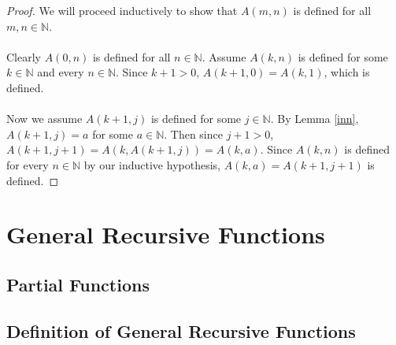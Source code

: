 \documentclass[12pt, letterpaper]{article}
\begin{document}
    \begin{proof}
      We will proceed inductively to show that $A(m, n)$ is defined for all $m, n \in \mathbb{N}$.
      \\ 
      \\
      Clearly $A(0, n)$ is defined for all $n \in \mathbb{N}$.
      Assume $A(k, n)$ is defined for some $k \in \mathbb{N}$ and every $n \in \mathbb{N}$.
      Since $k + 1 > 0$, $A(k + 1, 0) = A(k, 1)$, which is defined.
      \\
      \\
      Now we assume $A(k + 1, j)$ is defined for some $j \in \mathbb{N}$.
      By Lemma \ref{inn}, $A(k + 1, j) = a$ for some $a \in \mathbb{N}$.
      Then since $j + 1 > 0$, $A(k + 1, j + 1) = A(k, A(k + 1, j)) = A(k, a)$.
      Since $A(k, n)$ is defined for every $n \in \mathbb{N}$ by our inductive hypothesis,
      $A(k, a) = A(k + 1, j + 1)$ is defined.
    \end{proof}


  \section{General Recursive Functions}
    \subsection{Partial Functions}
    \subsection{Definition of General Recursive Functions}
\end{document}
